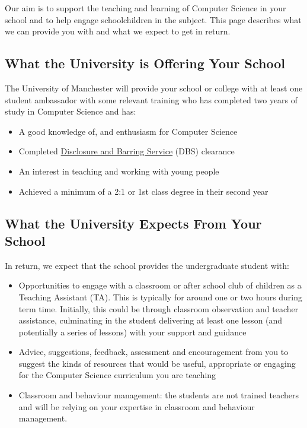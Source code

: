 \documentclass[
  12pt,
]{book}
\providecommand{\tightlist}{%
  \setlength{\itemsep}{0pt}\setlength{\parskip}{0pt}}
\begin{document}
Our aim is to support the teaching and learning of Computer Science in your school and to help engage schoolchildren in the subject. This page describes what we can provide you with and what we expect to get in return.

\subsection{What the University is Offering Your School}\label{what-the-university-is-offering-your-school}

The University of Manchester will provide your school or college with at least one student ambassador with some relevant training who has completed two years of study in Computer Science and has:

\begin{itemize}
\tightlist
\item
  A good knowledge of, and enthusiasm for Computer Science
\item
  Completed \href{https://www.gov.uk/government/organisations/disclosure-and-barring-service}{Disclosure and Barring Service} (DBS) clearance
\item
  An interest in teaching and working with young people
\item
  Achieved a minimum of a 2:1 or 1st class degree in their second year
\end{itemize}

\subsection{What the University Expects From Your School}\label{expectations}

In return, we expect that the school provides the undergraduate student with:

\begin{itemize}
\tightlist
\item
  Opportunities to engage with a classroom or after school club of children as a Teaching Assistant (TA). This is typically for around one or two hours during term time. Initially, this could be through classroom observation and teacher assistance, culminating in the student delivering at least one lesson (and potentially a series of lessons) with your support and guidance
\item
  Advice, suggestions, feedback, assessment and encouragement from you to suggest the kinds of resources that would be useful, appropriate or engaging for the Computer Science curriculum you are teaching
\item
  Classroom and behaviour management: the students are not trained teachers and will be relying on your expertise in classroom and behaviour management.
\end{itemize}
\end{document}
